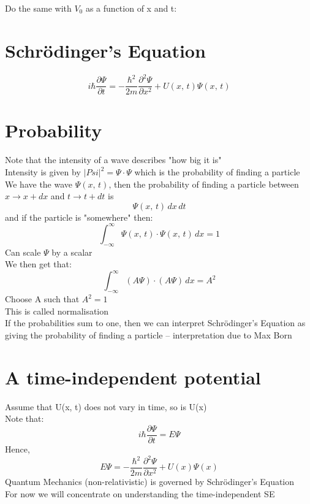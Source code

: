 \documentclass[a4paper, 11pt, fleqn, normalem]{report}
\begin{document}
Do the same with $V_{0}$ as a function of x and t:

\section{Schr\"{o}dinger's Equation}
\vspace{-20pt}
\begin{equation*}
    i\hbar\frac{\partial \Psi}{\partial t} = -\frac{\hbar^{2}}{2m}\frac{\partial^{2} \Psi}{\partial x^{2}} + U(x,\,t)\Psi(x,\,t)
\end{equation*}

\section{Probability}
Note that the intensity of a wave describes "how big it is" \\
Intensity is given by $|Psi|^{2} = \Psi\cdot\Psi$ which is the probability of finding a particle \\
We have the wave $\Psi(x,\,t)$, then the probability of finding a particle between $x \rightarrow x + dx$ and $t \rightarrow t + dt$ is
\begin{equation*}
    \Psi(x,\,t)\,dx\,dt
\end{equation*}
and if the particle is "somewhere" then:
\begin{equation*}
    \int_{-\infty}^{\infty} \Psi(x,\,t) \cdot \Psi(x,\,t)\,dx = 1
\end{equation*}
Can scale $\Psi$ by a scalar \\
We then get that:
\begin{equation*}
    \int_{-\infty}^{\infty} (A\Psi) \cdot (A\Psi)\,dx = A^{2}
\end{equation*}
Choose A such that $A^{2} = 1$ \\
This is called normalisation \\
If the probabilities sum to one, then we can interpret Schr\"{o}dinger's Equation as giving the probability of finding a particle -- interpretation due to Max Born

\section{A time-independent potential}
Assume that U(x, t) does not vary in time, so is U(x) \\
Note that:
\begin{equation*}
    i\hbar\frac{\partial\Psi}{\partial t} = E\Psi
\end{equation*}
Hence,
\begin{equation*}
    E\Psi = -\frac{\hbar^{2}}{2m}\frac{\partial^{2} \Psi}{\partial x^{2}} + U(x)\Psi(x)
\end{equation*}
Quantum Mechanics (non-relativistic) is governed by Schr\"{o}dinger's Equation \\
For now we will concentrate on understanding the time-independent SE
\end{document}
